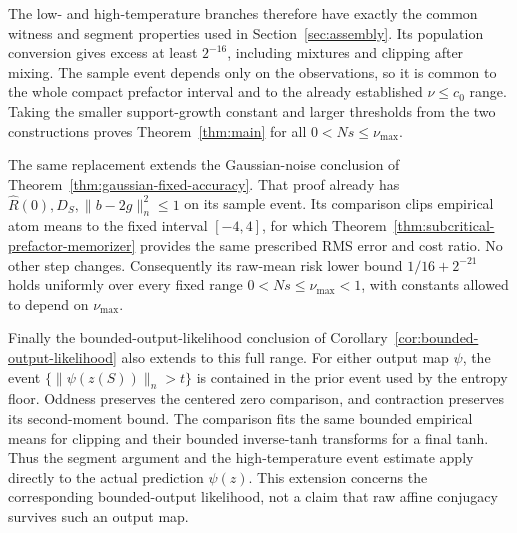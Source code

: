 The low- and high-temperature branches therefore have exactly the common witness and segment properties used in Section~\ref{sec:assembly}. Its population conversion gives excess at least $2^{-16}$, including mixtures and clipping after mixing. The sample event depends only on the observations, so it is common to the whole compact prefactor interval and to the already established $\nu\le c_0$ range. Taking the smaller support-growth constant and larger thresholds from the two constructions proves Theorem~\ref{thm:main} for all $0<Ns\le\nu_{\max}$.

The same replacement extends the Gaussian-noise conclusion of Theorem~\ref{thm:gaussian-fixed-accuracy}. That proof already has $\widehat R(0),D_S,\|b-2g\|_n^2\le1$ on its sample event. Its comparison clips empirical atom means to the fixed interval $[-4,4]$, for which Theorem~\ref{thm:subcritical-prefactor-memorizer} provides the same prescribed RMS error and cost ratio. No other step changes. Consequently its raw-mean risk lower bound $1/16+2^{-21}$ holds uniformly over every fixed range $0<Ns\le\nu_{\max}<1$, with constants allowed to depend on $\nu_{\max}$.

Finally the bounded-output-likelihood conclusion of Corollary~\ref{cor:bounded-output-likelihood} also extends to this full range. For either output map $\psi$, the event $\{\|\psi(z(S))\|_n>t\}$ is contained in the prior event used by the entropy floor. Oddness preserves the centered zero comparison, and contraction preserves its second-moment bound. The comparison fits the same bounded empirical means for clipping and their bounded inverse-tanh transforms for a final tanh. Thus the segment argument and the high-temperature event estimate apply directly to the actual prediction $\psi(z)$. This extension concerns the corresponding bounded-output likelihood, not a claim that raw affine conjugacy survives such an output map.

